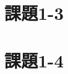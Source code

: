 \documentclass[a4j,11pt]{jarticle}
\begin{document}


\section{課題1-3}



\section{課題1-4}





\end{document}
